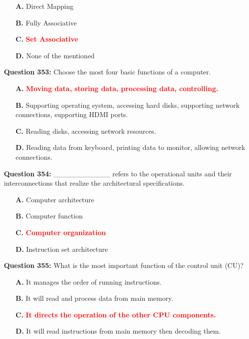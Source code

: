 \documentclass[12pt,a4paper]{article}
\begin{document}
\begin{itemize}
    \item[\textbf{A.}] Direct Mapping
    \item[\textbf{B.}] Fully Associative
    \item[\textbf{C.}] \textcolor{red}{\textbf{Set Associative}}
    \item[\textbf{D.}] None of the mentioned
\end{itemize}

\vspace{0.5cm}

\textbf{Question 353:} Choose the most four basic functions of a computer.

\begin{itemize}
    \item[\textbf{A.}] \textcolor{red}{\textbf{Moving data, storing data, processing data, controlling.}}
    \item[\textbf{B.}] Supporting operating system, accessing hard disks, supporting network connections, supporting HDMI ports.
    \item[\textbf{C.}] Reading disks, accessing network resources.
    \item[\textbf{D.}] Reading data from keyboard, printing data to monitor, allowing network connections.
\end{itemize}

\vspace{0.5cm}

\textbf{Question 354:} ___________ refers to the operational units and their interconnections that realize the architectural specifications.

\begin{itemize}
    \item[\textbf{A.}] Computer architecture
    \item[\textbf{B.}] Computer function
    \item[\textbf{C.}] \textcolor{red}{\textbf{Computer organization}}
    \item[\textbf{D.}] Instruction set architecture
\end{itemize}

\vspace{0.5cm}

\textbf{Question 355:} What is the most important function of the control unit (CU)?

\begin{itemize}
    \item[\textbf{A.}] It manages the order of running instructions.
    \item[\textbf{B.}] It will read and process data from main memory.
    \item[\textbf{C.}] \textcolor{red}{\textbf{It directs the operation of the other CPU components.}}
    \item[\textbf{D.}] It will read instructions from main memory then decoding them.
\end{itemize}
\end{document}
